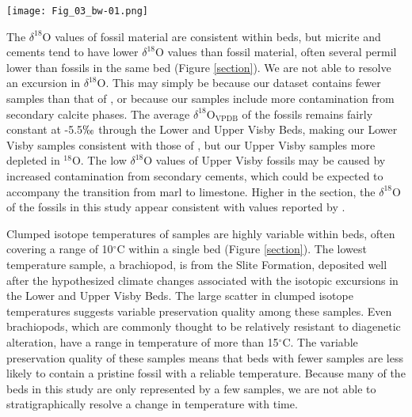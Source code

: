 \documentclass[5p, authoryear]{elsarticle}
\begin{document}
\begin{figure*}[t]
\centering
\texttt{[image: Fig\_03\_bw-01.png]}
\caption{The $\delta^{13}$C, $\delta^{18}$O and clumped isotope temperature of all the samples analyzed in this study, plotted against stratigraphic height. For the Lower \& Upper Visby and H\"{o}gklint Formations, a height of zero meters is defined by the contact between the Lower Visby Beds and the Upper Visby Beds. For the Slite Formation, a height of zero meters is defined as an arbitrary bed near the base of the outcrop. Brachiopod $\delta^{13}$C and $\delta^{18}$O measurements from \cite{Munnecke2003} are also included. Error bars represent the standard error of the mean.}
\label{section}
\end{figure*}

The $\delta^{18}$O values of fossil material are consistent within beds, but micrite and cements tend to have lower $\delta^{18}$O values than fossil material, often several permil lower than fossils in the same bed (Figure \ref{section}). We are not able to resolve an excursion in $\delta^{18}$O. This may simply be because our dataset contains fewer samples than that of \cite{Munnecke2003}, or because our samples include more contamination from secondary calcite phases. The average $\delta^{18}$O$_{\text{VPDB}}$ of the fossils remains fairly constant at -5.5$\permil$ through the Lower and Upper Visby Beds, making our Lower Visby samples consistent with those of \cite{Munnecke2003}, but our Upper Visby samples more depleted in $^{18}$O. The low $\delta^{18}$O values of Upper Visby fossils may be caused by increased contamination from secondary cements, which could be expected to accompany the transition from marl to limestone. Higher in the section, the $\delta^{18}$O of the fossils in this study appear consistent with values reported by \cite{Bickert1997}. 

Clumped isotope temperatures of samples are highly variable within beds, often covering a range of 10$^{\circ}$C within a single bed (Figure \ref{section}). The lowest temperature sample, a brachiopod, is from the Slite Formation, deposited well after the hypothesized climate changes associated with the isotopic excursions in the Lower and Upper Visby Beds. The large scatter in clumped isotope temperatures suggests variable preservation quality among these samples. Even brachiopods, which are commonly thought to be relatively resistant to diagenetic alteration, have a range in temperature of more than 15$^{\circ}$C. The variable preservation quality of these samples means that beds with fewer samples are less likely to contain a pristine fossil with a reliable temperature. Because many of the beds in this study are only represented by a few samples, we are not able to stratigraphically resolve a change in temperature with time. 
\end{document}
